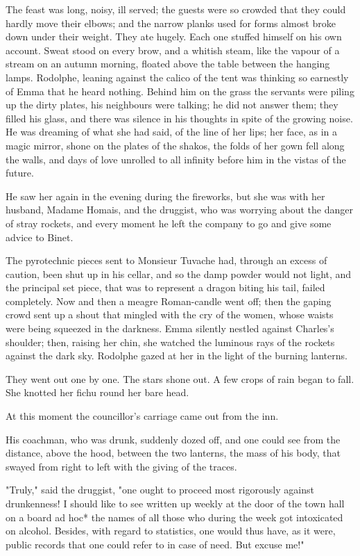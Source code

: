\documentclass[11pt,twocolumn]{ltugboat}
\begin{document}
The feast was long, noisy, ill served; the guests were so crowded that
they could hardly move their elbows; and the narrow planks used for
forms almost broke down under their weight. They ate hugely. Each one
stuffed himself on his own account. Sweat stood on every brow, and a
whitish steam, like the vapour of a stream on an autumn morning, floated
above the table between the hanging lamps. Rodolphe, leaning against
the calico of the tent was thinking so earnestly of Emma that he heard
nothing. Behind him on the grass the servants were piling up the dirty
plates, his neighbours were talking; he did not answer them; they filled
his glass, and there was silence in his thoughts in spite of the growing
noise. He was dreaming of what she had said, of the line of her lips;
her face, as in a magic mirror, shone on the plates of the shakos, the
folds of her gown fell along the walls, and days of love unrolled to all
infinity before him in the vistas of the future.

He saw her again in the evening during the fireworks, but she was with
her husband, Madame Homais, and the druggist, who was worrying about the
danger of stray rockets, and every moment he left the company to go and
give some advice to Binet.

The pyrotechnic pieces sent to Monsieur Tuvache had, through an excess
of caution, been shut up in his cellar, and so the damp powder would
not light, and the principal set piece, that was to represent a dragon
biting his tail, failed completely. Now and then a meagre Roman-candle
went off; then the gaping crowd sent up a shout that mingled with the
cry of the women, whose waists were being squeezed in the darkness. Emma
silently nestled against Charles's shoulder; then, raising her chin, she
watched the luminous rays of the rockets against the dark sky. Rodolphe
gazed at her in the light of the burning lanterns.

They went out one by one. The stars shone out. A few crops of rain began
to fall. She knotted her fichu round her bare head.

At this moment the councillor's carriage came out from the inn.

His coachman, who was drunk, suddenly dozed off, and one could see from
the distance, above the hood, between the two lanterns, the mass of his
body, that swayed from right to left with the giving of the traces.

"Truly," said the druggist, "one ought to proceed most rigorously
against drunkenness! I should like to see written up weekly at the door
of the town hall on a board ad hoc* the names of all those who during
the week got intoxicated on alcohol. Besides, with regard to statistics,
one would thus have, as it were, public records that one could refer to
in case of need. But excuse me!"
\end{document}
